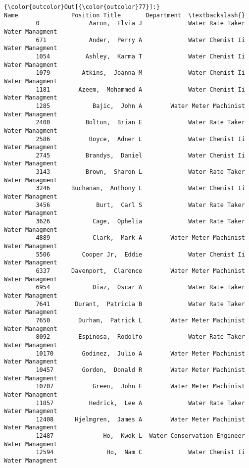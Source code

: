\documentclass[11pt]{article}
\begin{document}
\begin{Verbatim}[commandchars=\\\{\}]
{\color{outcolor}Out[{\color{outcolor}77}]:}                           Name               Position Title       Department  \textbackslash{}
         0              Aaron,  Elvia J             Water Rate Taker  Water Managment   
         671            Ander,  Perry A             Water Chemist Ii  Water Managment   
         1054          Ashley,  Karma T             Water Chemist Ii  Water Managment   
         1079         Atkins,  Joanna M             Water Chemist Ii  Water Managment   
         1181        Azeem,  Mohammed A             Water Chemist Ii  Water Managment   
         1285            Bajic,  John A        Water Meter Machinist  Water Managment   
         2400          Bolton,  Brian E             Water Rate Taker  Water Managment   
         2586           Boyce,  Adner L             Water Chemist Ii  Water Managment   
         2745          Brandys,  Daniel             Water Chemist Ii  Water Managment   
         3143          Brown,  Sharon L             Water Rate Taker  Water Managment   
         3246      Buchanan,  Anthony L             Water Chemist Ii  Water Managment   
         3456             Burt,  Carl S             Water Rate Taker  Water Managment   
         3626            Cage,  Ophelia             Water Rate Taker  Water Managment   
         4889            Clark,  Mark A        Water Meter Machinist  Water Managment   
         5506         Cooper Jr,  Eddie             Water Chemist Ii  Water Managment   
         6337      Davenport,  Clarence        Water Meter Machinist  Water Managment   
         6954            Diaz,  Oscar A             Water Rate Taker  Water Managment   
         7641       Durant,  Patricia B             Water Rate Taker  Water Managment   
         7650        Durham,  Patrick L        Water Meter Machinist  Water Managment   
         8092        Espinosa,  Rodolfo             Water Rate Taker  Water Managment   
         10170        Godinez,  Julio A        Water Meter Machinist  Water Managment   
         10457        Gordon,  Donald R        Water Meter Machinist  Water Managment   
         10707           Green,  John F        Water Meter Machinist  Water Managment   
         11857          Hedrick,  Lee A             Water Rate Taker  Water Managment   
         12408      Hjelmgren,  James A        Water Meter Machinist  Water Managment   
         12487              Ho,  Kwok L  Water Conservation Engineer  Water Managment   
         12594               Ho,  Nam C             Water Chemist Ii  Water Managment   

\end{Verbatim}
\end{document}
